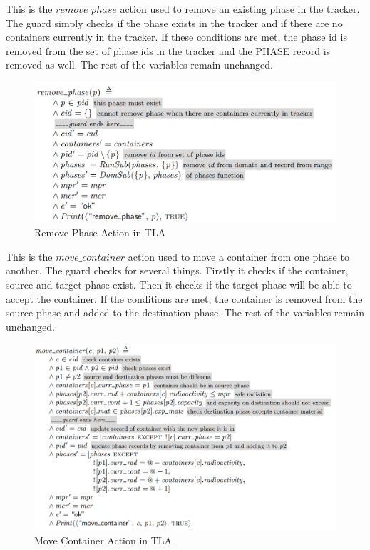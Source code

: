 \newpage
This is the $remove\_phase$ action used to remove an existing phase in the tracker. The guard simply checks if the phase exists in the tracker and if there are no containers currently in the tracker. If these conditions are met, the phase id is removed from the set of phase ids in the tracker and the PHASE record is removed as well. The rest of the variables remain unchanged.   
\begin{figure}[!htb]
\begin{center}
\includegraphics[width=.99\textwidth]{images/remove_phase.png}
\end{center}
\caption{Remove Phase Action in TLA}
\label{fig:remove_phase_action}
\end{figure}

\newpage
This is the $move\_container$ action used to move a container from one phase to another. The guard checks for several things. Firstly it checks if the container, source and target phase exist. Then it checks if the target phase will be able to accept the container. If the conditions are met, the container is removed from the source phase and added to the destination phase. The rest of the variables remain unchanged.   
\begin{figure}[!htb]
\begin{center}
\includegraphics[width=.99\textwidth]{images/move_container.png}
\end{center}
\caption{Move Container Action in TLA}
\label{fig:move_container_action}
\end{figure}

